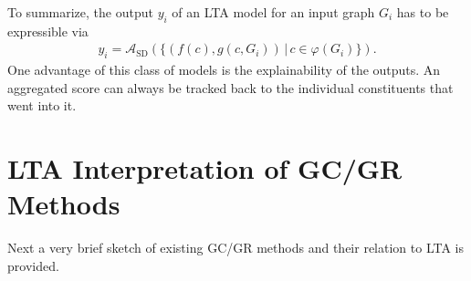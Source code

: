 \documentclass[12pt]{scrartcl}
\begin{document}
To summarize, the output $y_i$ of an LTA model for an input graph $G_i$ has to be expressible via
\begin{align}
	y_i = \mathcal{A}_{\text{SD}}(\{ (f(c), g(c, G_i)) \,|\, c \in \varphi(G_i) \}) \text{.}
\end{align}
One advantage of this class of models is the explainability of the outputs.
An aggregated score can always be tracked back to the individual constituents that went into it.

\section{LTA Interpretation of GC/GR Methods}%
\label{sec:lta-gcr}

Next a very brief sketch of existing GC/GR methods and their relation to LTA is provided.
\end{document}
